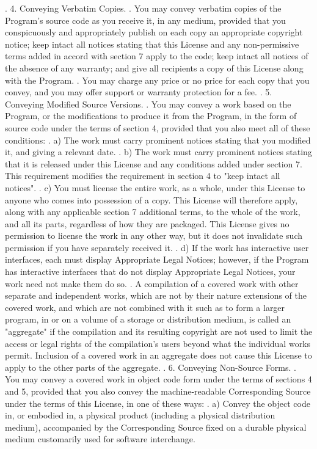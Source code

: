 \begin{script}
 .
   4. Conveying Verbatim Copies.
 .
   You may convey verbatim copies of the Program's source code as you
 receive it, in any medium, provided that you conspicuously and
 appropriately publish on each copy an appropriate copyright notice;
 keep intact all notices stating that this License and any
 non-permissive terms added in accord with section 7 apply to the code;
 keep intact all notices of the absence of any warranty; and give all
 recipients a copy of this License along with the Program.
 .
   You may charge any price or no price for each copy that you convey,
 and you may offer support or warranty protection for a fee.
 .
   5. Conveying Modified Source Versions.
 .
   You may convey a work based on the Program, or the modifications to
 produce it from the Program, in the form of source code under the
 terms of section 4, provided that you also meet all of these conditions:
 .
     a) The work must carry prominent notices stating that you modified
     it, and giving a relevant date.
 .
     b) The work must carry prominent notices stating that it is
     released under this License and any conditions added under section
     7.  This requirement modifies the requirement in section 4 to
     "keep intact all notices".
 .
     c) You must license the entire work, as a whole, under this
     License to anyone who comes into possession of a copy.  This
     License will therefore apply, along with any applicable section 7
     additional terms, to the whole of the work, and all its parts,
     regardless of how they are packaged.  This License gives no
     permission to license the work in any other way, but it does not
     invalidate such permission if you have separately received it.
 .
     d) If the work has interactive user interfaces, each must display
     Appropriate Legal Notices; however, if the Program has interactive
     interfaces that do not display Appropriate Legal Notices, your
     work need not make them do so.
 .
   A compilation of a covered work with other separate and independent
 works, which are not by their nature extensions of the covered work,
 and which are not combined with it such as to form a larger program,
 in or on a volume of a storage or distribution medium, is called an
 "aggregate" if the compilation and its resulting copyright are not
 used to limit the access or legal rights of the compilation's users
 beyond what the individual works permit.  Inclusion of a covered work
 in an aggregate does not cause this License to apply to the other
 parts of the aggregate.
 .
   6. Conveying Non-Source Forms.
 .
   You may convey a covered work in object code form under the terms
 of sections 4 and 5, provided that you also convey the
 machine-readable Corresponding Source under the terms of this License,
 in one of these ways:
 .
     a) Convey the object code in, or embodied in, a physical product
     (including a physical distribution medium), accompanied by the
     Corresponding Source fixed on a durable physical medium
     customarily used for software interchange.
\end{script}


